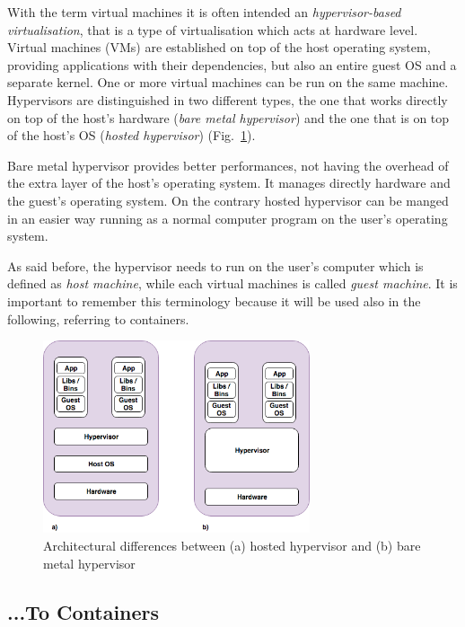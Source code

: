 \documentclass[a4paper,12pt]{article}
\def\myfig#1{Fig.~#1\xspace}
\begin{document}
With the term virtual machines it is often intended an \textit{hypervisor-based
virtualisation}, that is a type of virtualisation which acts at hardware level.
Virtual machines (VMs) are established on top of the host operating system,
providing applications with their dependencies, but also an entire guest OS and
a separate kernel. One or more virtual machines can be run on the same machine.
Hypervisors are distinguished in two different types, the one that works
directly on top of the host's hardware (\textit{bare metal hypervisor}) and the
one that is on top of the host's OS (\textit{hosted hypervisor})
(\myfig{\ref{fig:hypervisor_difference}}). \par Bare metal hypervisor provides
better performances, not having the overhead of the extra layer of the host's
operating system. It manages directly hardware and the guest's operating system.
On the contrary hosted hypervisor can be manged in an easier way running as a
normal computer program on the user's operating
system\cite{bui_docker_security}. \par As said before, the hypervisor needs to
run on the user's computer which is defined as \textit{host machine}, while each
virtual machines is called \textit{guest machine}. It is important to remember
this terminology because it will be used also in the following, referring to
containers. 

\begin{figure}[ht!]
  \centerline{\includegraphics[width=0.7\textwidth]{difference_bare_metal_hosted_hypervisor.png}}
  \caption{Architectural differences between (a) hosted hypervisor and (b) bare metal hypervisor}
  \label{fig:hypervisor_difference}
  \end{figure}


\subsection{...To Containers}
\end{document}
